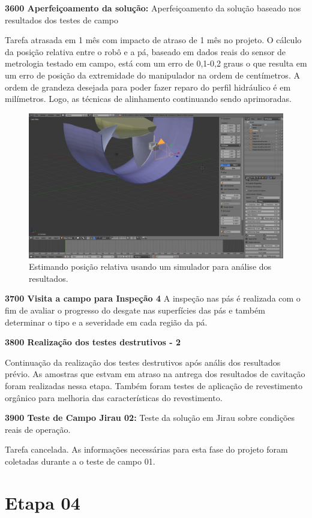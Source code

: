 \noindent
\textbf{3600 Aperfeiçoamento da solução:}
Aperfeiçoamento da solução baseado nos resultados dos testes de campo 

Tarefa atrasada em 1 mês com impacto de atraso de 1 mês no projeto. O cálculo da
posição relativa entre o robô e a pá, baseado em dados reais do sensor de
metrologia testado em campo, está com um erro de 0,1-0,2 graus o que resulta em
um erro de posição da extremidade do manipulador na ordem de centímetros. A
ordem de grandeza desejada para poder fazer reparo do perfil hidráulico é em
milímetros. Logo, as técnicas de alinhamento continuando sendo aprimoradas.

\begin{figure}\centering
\includegraphics[width=0.6\columnwidth]{figs/blensor_screen}
\caption{Estimando posição relativa usando um simulador para análise dos
resultados.}
\end{figure} 


\noindent
\textbf{3700  Visita a campo para Inspeção 4}
A inspeção nas pás é realizada com o fim de avaliar o progresso do desgate nas superfícies das pás e também determinar o tipo e a severidade em cada região da pá. 

\noindent
\textbf{3800 Realização dos testes destrutivos - 2}

Continuação da realização dos testes destrutivos após anális dos resultados prévio. As amostras que estvam em atraso na antrega dos resultados de cavitação foram realizadas nessa etapa. Também foram testes de aplicação de revestimento orgânico para melhoria das características do revestimento.


\noindent
\textbf{3900 Teste de Campo Jirau 02:} Teste da solução  em Jirau sobre
condições reais de operação.

Tarefa cancelada. As informações necessárias para esta fase do
projeto foram coletadas durante a o teste de campo 01. 

\section{Etapa 04} 

